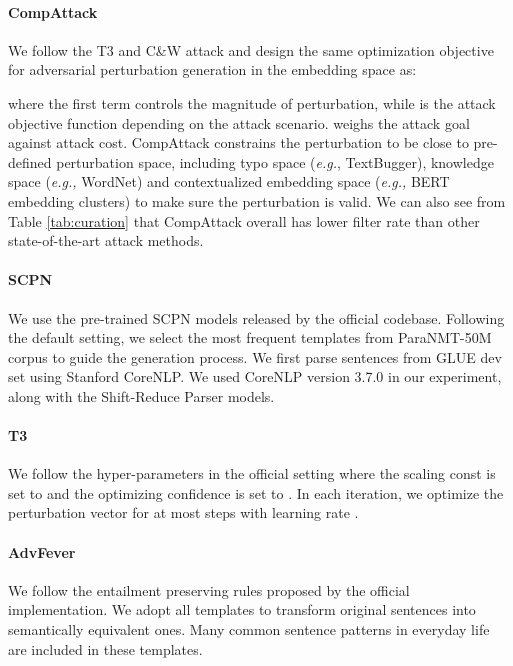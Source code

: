 \documentclass{article}
\begin{document}
\paragraph{CompAttack} We follow the T3 \citep{t3} and C\&W attack \citep{Carlini2018AudioAE} and design the same optimization objective for adversarial perturbation generation in the embedding space as:

where the first term controls the magnitude of perturbation, while  is the attack objective function depending on the attack scenario.  weighs the attack goal against attack cost. CompAttack constrains the perturbation to be close to pre-defined perturbation space, including typo space (\textit{e.g.}, TextBugger), knowledge space (\textit{e.g.,} WordNet) and contextualized embedding space (\textit{e.g., } BERT embedding clusters) to make sure the perturbation is valid. We can also see from Table \ref{tab:curation} that CompAttack overall has lower filter rate than other state-of-the-art attack methods.


\paragraph{SCPN}
We use the pre-trained SCPN models released by the official codebase. Following the default setting, we select the most frequent  templates from ParaNMT-50M corpus \cite{wieting2017paranmt} to guide the generation process. We first parse sentences from GLUE dev set using Stanford CoreNLP. We used CoreNLP version 3.7.0 in our experiment, along with the Shift-Reduce Parser models.

\paragraph{T3}
We follow the hyper-parameters in the official setting where the scaling const is set to  and the optimizing confidence is set to . In each iteration, we optimize the perturbation vector for at most  steps with learning rate .

\paragraph{AdvFever}
We follow the entailment preserving rules proposed by the official implementation. We adopt all  templates to transform original sentences into semantically equivalent ones. Many common sentence patterns in everyday life are included in these templates.


\label{appendix:compattack}
\end{document}
